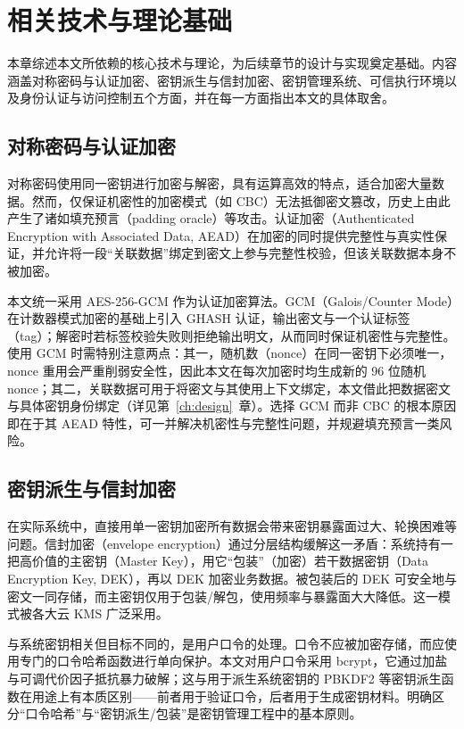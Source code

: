 \chapter{相关技术与理论基础}
\label{ch:background}

本章综述本文所依赖的核心技术与理论，为后续章节的设计与实现奠定基础。内容涵盖对称密码与认证加密、密钥派生与信封加密、密钥管理系统、可信执行环境以及身份认证与访问控制五个方面，并在每一方面指出本文的具体取舍。

\section{对称密码与认证加密}
\label{sec:aead}

对称密码使用同一密钥进行加密与解密，具有运算高效的特点，适合加密大量数据。然而，仅保证机密性的加密模式（如 CBC）无法抵御密文篡改，历史上由此产生了诸如填充预言（padding oracle）等攻击。认证加密（Authenticated Encryption with Associated Data, AEAD）在加密的同时提供完整性与真实性保证，并允许将一段“关联数据”绑定到密文上参与完整性校验，但该关联数据本身不被加密\cite{rogaway2002aead, rfc5116}。

本文统一采用 AES-256-GCM 作为认证加密算法\cite{fips197, dworkin2007gcm, mcgrew2004gcm}。GCM（Galois/Counter Mode）在计数器模式加密的基础上引入 GHASH 认证，输出密文与一个认证标签（tag）；解密时若标签校验失败则拒绝输出明文，从而同时保证机密性与完整性。使用 GCM 时需特别注意两点：其一，随机数（nonce）在同一密钥下必须唯一，nonce 重用会严重削弱安全性，因此本文在每次加密时均生成新的 96 位随机 nonce；其二，关联数据可用于将密文与其使用上下文绑定，本文借此把数据密文与具体密钥身份绑定（详见第~\ref{ch:design}~章）。选择 GCM 而非 CBC 的根本原因即在于其 AEAD 特性，可一并解决机密性与完整性问题，并规避填充预言一类风险。

\section{密钥派生与信封加密}
\label{sec:envelope}

在实际系统中，直接用单一密钥加密所有数据会带来密钥暴露面过大、轮换困难等问题。信封加密（envelope encryption）通过分层结构缓解这一矛盾：系统持有一把高价值的主密钥（Master Key），用它“包装”（加密）若干数据密钥（Data Encryption Key, DEK），再以 DEK 加密业务数据。被包装后的 DEK 可安全地与密文一同存储，而主密钥仅用于包装/解包，使用频率与暴露面大大降低。这一模式被各大云 KMS 广泛采用\cite{nist80057}。

与系统密钥相关但目标不同的，是用户口令的处理。口令不应被加密存储，而应使用专门的口令哈希函数进行单向保护。本文对用户口令采用 bcrypt\cite{provos1999bcrypt}，它通过加盐与可调代价因子抵抗暴力破解；这与用于派生系统密钥的 PBKDF2\cite{rfc8018} 等密钥派生函数在用途上有本质区别——前者用于验证口令，后者用于生成密钥材料。明确区分“口令哈希”与“密钥派生/包装”是密钥管理工程中的基本原则。

